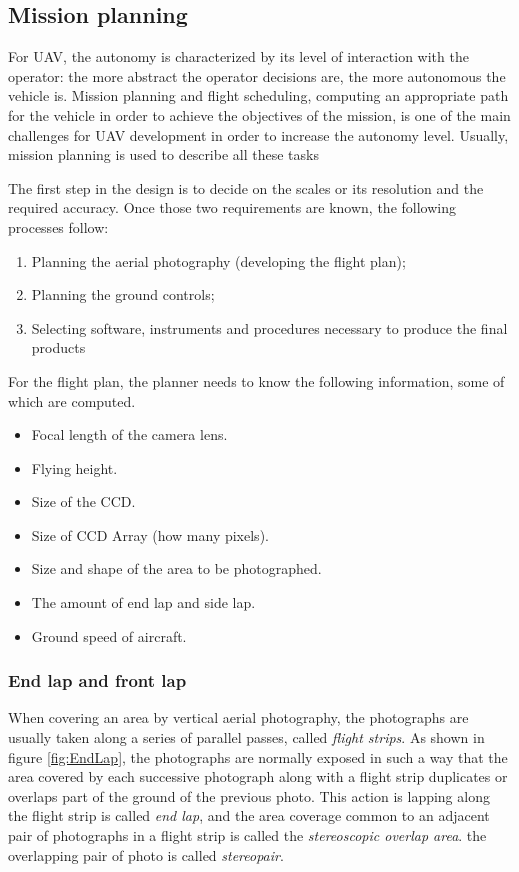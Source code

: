 \subsection{Mission planning} For UAV, the autonomy is characterized by its level of
interaction with the operator: the more abstract the operator decisions are, the more autonomous the vehicle is. Mission planning and flight scheduling, computing an appropriate path for the vehicle in order to achieve the objectives of the mission, is one of the main challenges for UAV development in order to increase the autonomy level. Usually, mission planning is used to describe all these tasks\cite{4281723}

The first step in the design is to decide on the scales or its resolution and the required accuracy. Once those two requirements are known, the following processes follow:
\begin{enumerate}
\item Planning the aerial photography (developing the flight plan);
\item Planning the ground controls;
\item Selecting software, instruments and procedures necessary to produce the final products
\end{enumerate}
For the flight plan, the planner needs to know the following information, some of which are computed.\cite{Design_plann}
\begin{itemize}
\item Focal length of the camera lens.
\item Flying height.
\item Size of the CCD.
\item Size of CCD Array (how many pixels).
\item Size and shape of the area to be photographed.
\item The amount of end lap and side lap.
\item Ground speed of aircraft.
\end{itemize}
\subsubsection{End lap and front lap}
When covering an area by vertical aerial photography, the photographs are usually taken along a series of parallel passes, called \textit{flight strips}. As shown in figure \ref{fig:EndLap}, the photographs are normally exposed in such a way that the area covered by each successive photograph along with a flight strip duplicates or overlaps part of the ground of the previous photo. This action is lapping along the flight strip is called \textit{end lap}, and the area coverage common to an adjacent pair of photographs in a flight strip is called the \textit{stereoscopic overlap area}. the overlapping pair of photo is called \textit{stereopair}\cite{elements_photogrammetry}.

